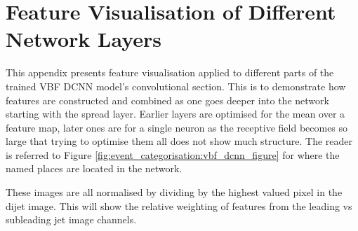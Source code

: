 
\chapter{Feature Visualisation of Different Network Layers}
\label{appendix:feature_vis}
This appendix presents feature visualisation applied to different parts of the trained VBF DCNN model's convolutional section.
This is to demonstrate how features are constructed and combined as one goes deeper into the network starting with the spread layer.
Earlier layers are optimised for the mean over a feature map, later ones are for a single neuron as the receptive field becomes so large that trying to optimise them all does not show much structure.
The reader is referred to Figure \ref{fig:event_categorisation:vbf_dcnn_figure} for where the named places are located in the network.

These images are all normalised by dividing by the highest valued pixel in the dijet image. This will show the relative weighting of features from the leading vs subleading jet image channels.

